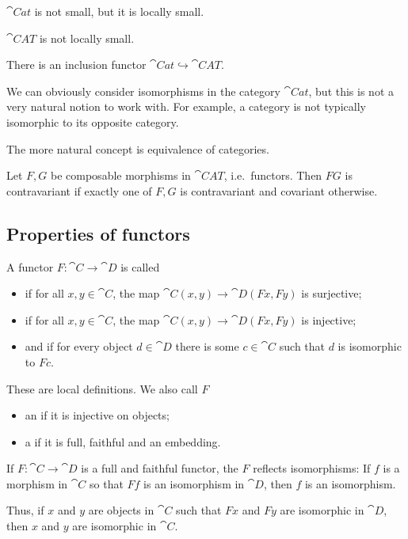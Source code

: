 \begin{lemma}
$\cat{Cat}$ is not small, but it is locally small.

$\cat{CAT}$ is not locally small.
\end{lemma}
There is an inclusion functor $\cat{Cat} \hookrightarrow \cat{CAT}$.

We can obviously consider isomorphisms in the category $\cat{Cat}$, but this is not a very natural notion to work with. For example, a category is not typically isomorphic to its opposite category.

The more natural concept is equivalence of categories.

\begin{lemma} \label{varianceOfComposite}
Let $F,G$ be composable morphisms in $\cat{CAT}$, i.e.\ functors. Then $FG$ is contravariant if exactly one of $F,G$ is contravariant and covariant otherwise.
\end{lemma}


\subsection{Properties of functors}
\begin{definition}
A functor $F:\cat{C}\to\cat{D}$ is called
\begin{itemize}
\item {} if for all $x,y\in \cat{C}$, the map $\cat{C}(x,y) \to \cat{D}(Fx,Fy)$ is surjective;
\item {} if for all $x,y\in \cat{C}$, the map $\cat{C}(x,y) \to \cat{D}(Fx,Fy)$ is injective;
\item and  if for every object $d\in\cat{D}$ there is some $c\in\cat{C}$ such that $d$ is isomorphic to $Fc$.
\end{itemize}
These are local definitions. We also call $F$
\begin{itemize}
\item an  if it is injective on objects;
\item a  if it is full, faithful and an embedding.
\end{itemize}
\end{definition}

\begin{lemma} \label{isomorphismCreationReflection}
If $F:\cat{C}\to\cat{D}$ is a full and faithful functor, the $F$ reflects isomorphisms:
If $f$ is a morphism in $\cat{C}$ so that $Ff$ is an isomorphism in $\cat{D}$, then $f$ is an isomorphism.
\end{lemma}
Thus, if $x$ and $y$ are objects in $\cat{C}$ such that $Fx$ and $Fy$ are isomorphic in $\cat{D}$, then $x$ and $y$ are isomorphic in $\cat{C}$.

